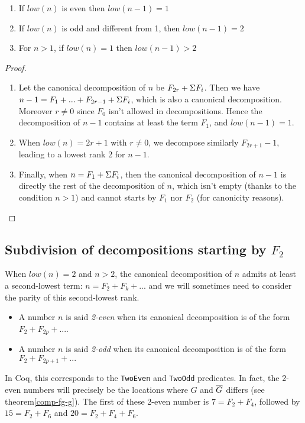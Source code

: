 \documentclass[a4paper,11pt]{article}
\begin{document}
\begin{theorem}\label{fibpred}
\noindent
\begin{enumerate}
\item If $low(n)$ is even then $low(n-1) = 1$
\item If $low(n)$ is odd and different from 1, then $low(n-1) = 2$
\item For $n>1$, if $low(n)=1$ then $low(n-1)>2$
\end{enumerate}
\end{theorem}
\begin{proof}
\noindent
\begin{enumerate}
\item Let the canonical decomposition of $n$ be $F_{2r} +
  \Sigma F_i$. Then we have $n-1 = F_1 + ... + F_{2r-1} + \Sigma F_i$, which
 is also a canonical decomposition. Moreover $r\neq 0$ since $F_0$
 isn't allowed in decompositions. Hence the decomposition of $n-1$
 contains at least the term $F_1$, and $low(n-1)=1$.
\item When $low(n) = 2r+1$ with $r\neq 0$, we decompose
 similarly $F_{2r+1}-1$, leading to a lowest rank 2 for $n-1$.
\item Finally, when $n = F_1 + \Sigma F_i$, then the canonical decomposition
  of $n-1$ is directly the rest of the decomposition of $n$, which
  isn't empty (thanks to the condition $n>1$) and
  cannot starts by $F_1$ nor $F_2$ (for canonicity reasons).
\end{enumerate}
\end{proof}

\subsection{Subdivision of decompositions starting by $F_2$}

When $low(n)=2$ and $n>2$, the canonical decomposition of $n$
admits at least a second-lowest term: $n = F_2 + F_k + ...$ and we
will sometimes
need to consider the parity of this second-lowest rank.

\begin{definition}
\noindent
\begin{itemize}
\item A number $n$ is said \emph{2-even} when its canonical decomposition
  is of the form $F_2 + F_{2p} + ...$.
\item A number $n$ is said \emph{2-odd} when its canonical decomposition
  is of the form $F_2 + F_{2p+1} + ...$
\end{itemize}
\end{definition}
In Coq, this corresponds to the {\tt TwoEven} and {\tt TwoOdd}
predicates.
In fact, the 2-even numbers will precisely be the locations where
$G$ and $\overline{G}$ differs (see theorem\ref{comp-fg-g}). The first of these 2-even number is
$7 = F_2+F_4$, followed by $15 = F_2 + F_6$ and $20 = F_2+F_4+F_6$.
\end{document}
